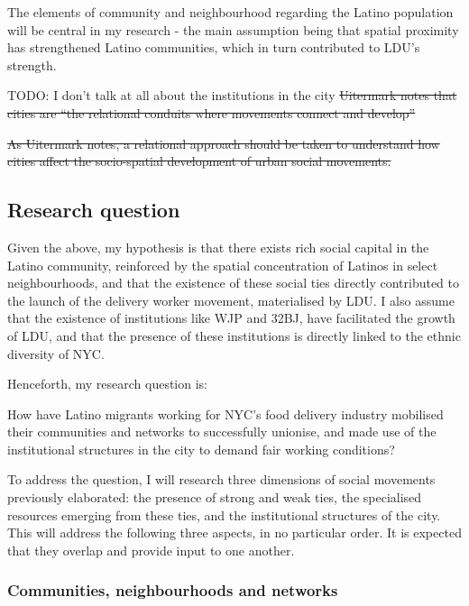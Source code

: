 \documentclass{article}
\begin{document}
The elements of community and neighbourhood regarding the Latino population will be central in my research - the main assumption being that spatial proximity has strengthened Latino communities, which in turn contributed to LDU’s strength.

TODO: I don't talk at all about the institutions in the city
\sout{Uitermark notes that cities are ``the relational conduits where movements connect and develop''} %

\sout{As Uitermark notes, a relational approach should be taken to understand how cities affect the socio-spatial development of urban social movements.} %

\subsection{Research question}

Given the above, my hypothesis is that there exists rich social capital in the Latino community, reinforced by the spatial concentration of Latinos in select neighbourhoods, and that the existence of these social ties directly contributed to the launch of the delivery worker movement, materialised by LDU. 
I also assume that the existence of institutions like WJP and 32BJ, have facilitated the growth of LDU, and that the presence of these institutions is directly linked to the ethnic diversity of NYC.

Henceforth, my research question is:

\begin{center}
How have Latino migrants working for NYC's food delivery industry mobilised their communities and networks to successfully unionise, and made use of the institutional structures in the city to demand fair working conditions?
\end{center}

To address the question, I will research three dimensions of social movements previously elaborated: the presence of strong and weak ties, the specialised resources emerging from these ties, and the institutional structures of the city. This will address the following three aspects, in no particular order. It is expected that they overlap and provide input to one another.

\subsubsection{Communities, neighbourhoods and networks}
\end{document}
